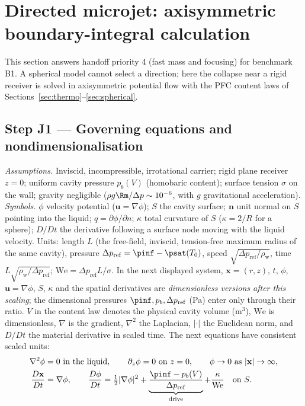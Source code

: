 \section{Directed microjet: axisymmetric boundary-integral calculation}\label{sec:jet}
This section answers handoff priority 4 (fast mass and focusing) for benchmark B1. A spherical model
cannot select a direction; here the collapse near a rigid receiver is solved in axisymmetric potential
flow with the PFC content laws of Sections~\ref{sec:thermo}--\ref{sec:spherical}.

\subsection{Step J1 --- Governing equations and nondimensionalisation}
\emph{Assumptions.} Inviscid, incompressible, irrotational carrier; rigid plane receiver $z=0$;
uniform cavity pressure $p_b(V)$ (homobaric content); surface tension $\sigma$ on the wall; gravity
negligible ($\rho g\Rm/\Delta p\sim10^{-6}$, with $g$ gravitational acceleration). \emph{Symbols.} $\phi$ velocity potential
($\mathbf u=\nabla\phi$); $S$ the cavity surface; $\mathbf n$ unit normal on $S$ pointing into the liquid;
$q=\partial\phi/\partial n$; $\kappa$ total curvature of $S$ ($\kappa=2/R$ for a sphere);
$D/Dt$ the derivative following a surface node moving with the liquid velocity. Units: length $L$
(the free-field, inviscid, tension-free maximum radius of the same cavity), pressure
$\Delta p_{\mathrm{ref}}=\pinf-\psat(T_0)$, speed $\sqrt{\Delta p_{\mathrm{ref}}/\rho_{\mathrm w}}$, time
$L\sqrt{\rho_{\mathrm w}/\Delta p_{\mathrm{ref}}}$; $\mathrm{We}=\Delta p_{\mathrm{ref}}L/\sigma$.
In the next displayed system, $\mathbf x=(r,z)$, $t$, $\phi$, $\mathbf u=\nabla\phi$, $S$,
$\kappa$ and the spatial derivatives are \emph{dimensionless versions after this scaling};
the dimensional pressures $\pinf,p_b,\Delta p_{\mathrm{ref}}$ (Pa) enter only through their ratio.
$V$ in the content law denotes the physical cavity volume (m$^3$), $\mathrm{We}$ is dimensionless,
$\nabla$ is the gradient, $\nabla^2$ the Laplacian, $|\cdot|$ the Euclidean norm, and $D/Dt$
the material derivative in scaled time. The next equations have consistent scaled units:
\begin{align}
\nabla^2\phi&=0\ \text{in the liquid},\qquad \partial_z\phi=0\ \text{on }z=0,\qquad \phi\to0\ \text{as }|\mathbf x|\to\infty,\label{eq:laplace}\\
\frac{D\mathbf x}{Dt}&=\nabla\phi,\qquad
\frac{D\phi}{Dt}=\tfrac12|\nabla\phi|^2+\underbrace{\frac{\pinf-p_b(V)}{\Delta p_{\mathrm{ref}}}}_{\text{drive}}+\frac{\kappa}{\mathrm{We}}\quad\text{on }S.\label{eq:bern}
\end{align}
